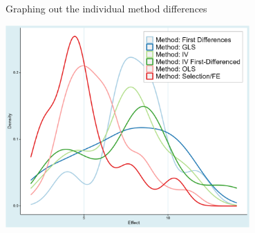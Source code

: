 \documentclass{beamer} %
\begin{document}



\begin{frame}{Graphing out the individual method differences}
    \begin{center}
        \includegraphics[width=0.7\textwidth]{Figures/twins_prima_method.png}
    \end{center}
\end{frame}
\end{document}
